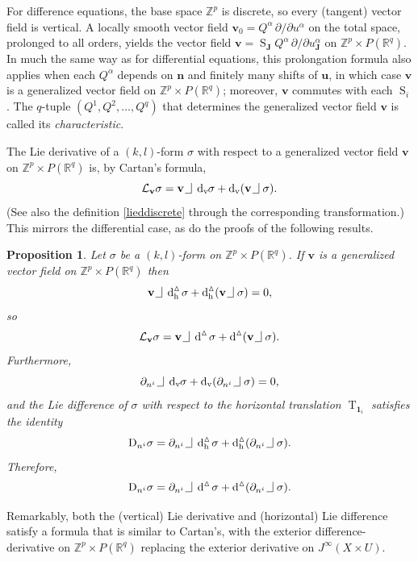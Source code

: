 \documentclass[11pt]{article} %
\numberwithin{equation}{section}
\newcommand{\intpsym}{\,\, \setlength{\unitlength}{0.4mm}
	\begin{picture}(0, 0)(5, 5)%
	\put(0, 4){\line(1,0){5}} \put(5,4){\line(0,1){8}}
	\end{picture}\,\,}
\newcommand{\intp}{\,\,\intpsym}
\newcommand{\es}{\operatorname{S}}
\newcommand{\te}{\operatorname{T}}
\newcommand{\upd}{\operatorname{d}}
\newcommand{\uph}{\operatorname{h}}
\newcommand{\upv}{\operatorname{v}}
\newcommand{\p}{\partial}
\newcommand{\dv}{\upd_{\upv}\!}
\newcommand{\diffi}{\mathrm{D}_{n^i}}
\newcommand{\mbn}{\mathbf{n}}
\newcommand{\mbu}{\mathbf{u}}
\newcommand{\mbv}{\mathbf{v}}
\newcommand{\mbJ}{\mathbf{J}}
\newcommand{\mcL}{\mathcal{L}}
\newcommand{\dD}{\upd^{\vartriangle}}
\newcommand{\dDh}{\upd^{\vartriangle}_{\uph}}
\theoremstyle{plain}
\newtheorem{prop}[thm]{Proposition}
\theoremstyle{definition}
\begin{document}
For difference equations, the base space $\mathbb{Z}^p$ is discrete, so every (tangent) vector field is vertical. A locally smooth vector field $\mbv_0=Q^\alpha\,\p/\p u^\alpha$ on the total space, prolonged to all orders, yields the vector field $\mbv=\es_{\mbJ}\!Q^\alpha\,\p/\p u^\alpha_{\mbJ}$ on $\mathbb{Z}^p\times P(\mathbb{R}^q)$. In much the same way as for differential equations, this prolongation formula also applies when each $Q^\alpha$ depends on $\mbn$ and finitely many shifts of $\mbu$, in which case $\mbv$ is a generalized vector field on $\mathbb{Z}^p\times P(\mathbb{R}^q)$; moreover,  $\mbv$ commutes with each $\es_i$ \cite{Hy2014}. The $q$-tuple $(Q^1,Q^2,\dots,Q^q)$ that determines the generalized vector field $\mbv$ is called its \textit{characteristic}.

The Lie derivative of a $(k,l)$-form $\sigma$ with respect to a generalized vector field $\mbv$ on $\mathbb{Z}^p\times P(\mathbb{R}^q)$ is, by Cartan's formula,
\begin{equation}
\mcL_\mbv\sigma=\mbv\intp\dv \;\!\!\sigma+\dv\,(\mbv\intp\sigma).
\end{equation}
(See also the definition \eqref{lieddiscrete} through the corresponding transformation.)
This mirrors the differential case, as do the proofs of the following results.
\begin{prop}\label{prop:symmetry}
	Let $\sigma$ be a $(k,l)$-form on $\mathbb{Z}^p\times P(\mathbb{R}^q)$. If $\mbv$ is a generalized vector field on $\mathbb{Z}^p\times P(\mathbb{R}^q)$ then
	\[
	\mbv\intp\dDh\;\!\!\sigma+\dDh(\mbv\intp\sigma)=0,
	\]
	so
	\[
	\mcL_\mbv \sigma=\mbv\intp\dD\;\!\!\sigma+\dD(\mbv\intp\sigma).	
	\]
	Furthermore,
	\[
	\p_{n^i}\intp\dv \;\!\!\sigma+\dv\,(\p_{n^i}\intp\sigma)=0,
	\]
	and the Lie difference of $\sigma$ with respect to the horizontal translation $\te_{\mathbf{1}_i}$ satisfies the identity
	\[
	\diffi\sigma=\p_{n^i}\intp\dDh\;\!\!\sigma+\dDh(\p_{n^i}\intp\sigma).
	\]
	Therefore,
	\[
	\diffi\sigma=\p_{n^i}\intp\dD\;\!\!\sigma+\dD(\p_{n^i}\intp\sigma).
	\]
\end{prop}

Remarkably, both the (vertical) Lie derivative and (horizontal) Lie difference satisfy a formula that is similar to Cartan's, with the exterior difference-derivative on $\mathbb{Z}^p\times P(\mathbb{R}^q)$ replacing the exterior derivative on $J^{\infty}(X\times U)$.
\end{document}
